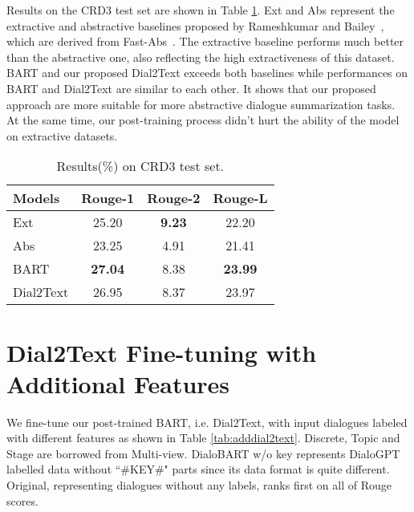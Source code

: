 Results on the CRD3 test set are shown in Table \ref{tab:crd3results}. Ext and Abs represent the extractive and abstractive baselines proposed by Rameshkumar and Bailey~, which are derived from Fast-Abs~\cite{chen2018fast}.
The extractive baseline performs much better than the abstractive one, also reflecting the high extractiveness of this dataset. 
BART and our proposed Dial2Text exceeds both baselines while performances on BART and Dial2Text are similar to each other.
It shows that our proposed approach are more suitable for more abstractive dialogue summarization tasks. At the same time, our post-training process didn't hurt the ability of the model on extractive datasets.

\begin{table}[h]
	\centering
	\small
	\begin{tabular}{lccc}
		\toprule[1pt]
		\textbf{Models} & \textbf{Rouge-1} & \textbf{Rouge-2} & \textbf{Rouge-L} \\
		\midrule[1pt]
		{Ext} &25.20 &\textbf{9.23} &22.20 \\
		{Abs} & 23.25&4.91 &21.41\\
		{BART} & \textbf{27.04}&8.38 &\textbf{23.99} \\
		{Dial2Text} &26.95 &8.37 &23.97  \\
		\bottomrule[1pt]
	\end{tabular}
	\caption{Results(\%) on CRD3 test set.}
	\label{tab:crd3results}
\end{table}



\section{Dial2Text Fine-tuning with Additional Features}

We fine-tune our post-trained BART, i.e. Dial2Text, with input dialogues labeled with different features as shown in Table \ref{tab:adddial2text}.
Discrete, Topic and Stage are borrowed from Multi-view. DialoBART w/o key represents DialoGPT labelled data without ``\#KEY\#" parts since its data format is quite different. Original, representing dialogues without any labels, ranks first on all of Rouge scores.

